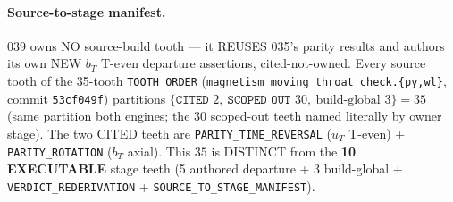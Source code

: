 \paragraph{Source-to-stage manifest.}
039 owns NO source-build tooth --- it REUSES 035's parity results and authors its own
NEW \(b_T\) T-even departure assertions, cited-not-owned. Every source tooth of the
35-tooth \texttt{TOOTH\_ORDER} (\texttt{magnetism\_moving\_throat\_check.\{py,wl\}},
commit \texttt{53cf049f}) partitions
\(\{\texttt{CITED }2,\ \texttt{SCOPED\_OUT }30,\ \text{build-global }3\}=35\) (same
partition both engines; the 30 scoped-out teeth named literally by owner stage). The
two CITED teeth are \texttt{PARITY\_TIME\_REVERSAL} (\(u_T\) T-even) +
\texttt{PARITY\_ROTATION} (\(b_T\) axial). This \(35\) is DISTINCT from the \textbf{10
EXECUTABLE} stage teeth (5 authored departure + 3 build-global +
\texttt{VERDICT\_REDERIVATION} + \texttt{SOURCE\_TO\_STAGE\_MANIFEST}).

